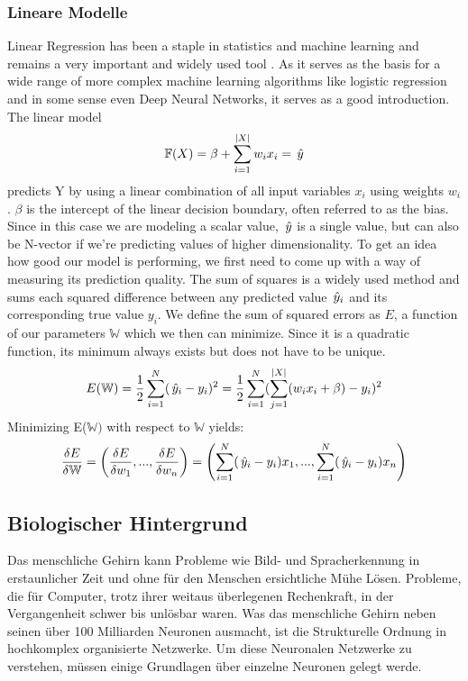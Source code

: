 \subsubsection{Lineare Modelle}
Linear Regression has been a staple in statistics and machine learning and remains a very important and widely used tool \cite{hastie01statisticallearning}. As it serves as the basis for a wide range of more complex machine learning algorithms like logistic regression and in some sense even Deep Neural Networks, it serves as a good introduction. The linear model 
\begin{align*}
\mathbb{F}(X) =  \beta + \sum_{i=1}^{|X|}w_ix_i = \,\hat{y}
\end{align*} 
predicts Y by using a linear combination of all input variables $x_i$ using weights $w_i$. $\beta$ is the intercept of the linear decision boundary, often referred to as the bias. Since in this case we are modeling a scalar value, $\,\hat{y}$ is a single value, but can also be N-vector if we're predicting values of higher dimensionality. To get an idea how good our model is performing, we first need to come up with a way of measuring its prediction quality. The sum of squares is a widely used method and sums each squared difference between any predicted value $\,\hat{y}_i$ and its corresponding true value $y_i$. We define the sum of squared errors as $E$, a function of our parameters $\mathbb{W}$ which we then can minimize. Since it is a quadratic function, its minimum always exists but does not have to be unique.
\begin{align*}
E(\mathbb{W}) = \frac{1}{2}\sum_{i=1}^{N}(\,\hat{y}_i - y_i)^2 =
\frac{1}{2}\sum_{i=1}^{N}(\sum_{j=1}^{|X|}(w_ix_i + \beta) - y_i)^2
\end{align*}
Minimizing E($\mathbb{W})$ with respect to $\mathbb{W}$ yields:
\begin{align*}
\frac{\delta E}{\delta \mathbb{W}} =  \left(\frac{\delta E}{\delta w_1 },...,\frac{\delta E}{\delta w_n }\right) = \left( \sum_{i=1}^{N}(\,\hat{y}_i - y_i)x_1,...,\sum_{i=1}^{N}(\,\hat{y}_i - y_i)x_n \right)
\end{align*}
\subsection{Biologischer Hintergrund}
Das menschliche Gehirn kann Probleme wie Bild- und Spracherkennung in erstaunlicher Zeit und ohne für den Menschen ersichtliche Mühe Lösen. Probleme, die für Computer, trotz ihrer weitaus überlegenen Rechenkraft, in der Vergangenheit schwer bis unlösbar waren. Was das menschliche Gehirn neben seinen über 100 Milliarden Neuronen ausmacht, ist die Strukturelle Ordnung in hochkomplex organisierte Netzwerke. Um diese Neuronalen Netzwerke zu verstehen, müssen einige Grundlagen über einzelne Neuronen gelegt werde.
